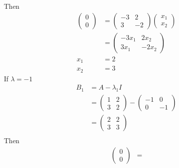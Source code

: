\documentclass[13pt]{article}
\begin{document}
\begin{enumerate}[label=(\alph*),leftmargin=*]
\begin{enumerate}[label=(\roman*),leftmargin=*]
      Then
      \begin{align*}
        \begin{pmatrix}
          0 \\
          0
        \end{pmatrix} &=
                        \begin{pmatrix}
                          -3 & 2 \\
                          3 & -2
                        \end{pmatrix} 
                        \begin{pmatrix}
                          x_1 \\
                          x_2
                        \end{pmatrix} \\
                      &=
                        \begin{pmatrix}
                          -3x_1 & 2x_2 \\
                          3x_1 & -2x_2
                        \end{pmatrix} \\
        x_1 &= 2 \\
        x_2 &= 3
      \end{align*}
      \newpage If $\lambda = -1$ 
      \begin{align*}
        B_1 &= A - \lambda_1 I \\
            &=
              \begin{pmatrix}
                1 & 2 \\
                3 & 2
              \end{pmatrix} -
              \begin{pmatrix}
                -1 & 0 \\
                0 & -1
              \end{pmatrix} \\
            &=
              \begin{pmatrix}
                2 & 2 \\
                3 & 3
              \end{pmatrix} \\
      \end{align*}
      Then
      \begin{align*}
        \begin{pmatrix}
          0 \\
          0
        \end{pmatrix} &=

\end{align*}
\end{enumerate}
\end{enumerate}
\end{document}
